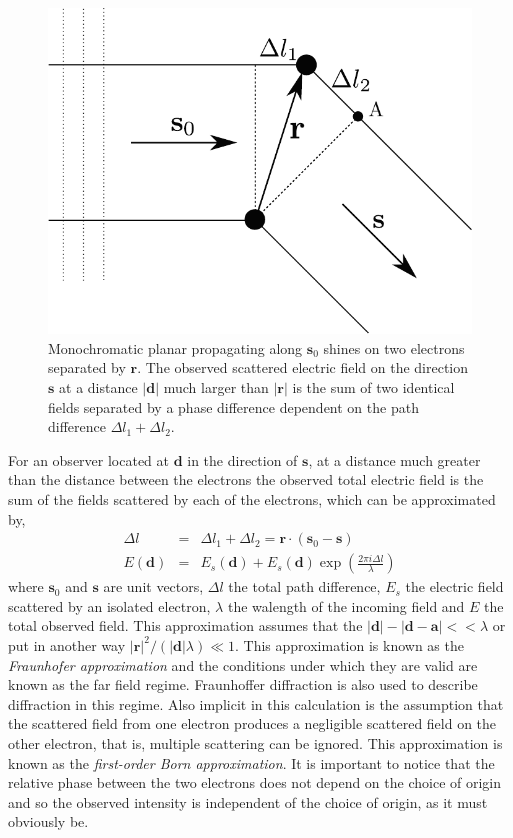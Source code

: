 \begin{figure}[h]
\begin{center}
\includegraphics[width=0.7 \columnwidth]{Diffraction_Theory/two_electrons.pdf}
\end{center}
\caption{Monochromatic planar propagating along $\mathbf s_0$ shines on two
  electrons separated by $\mathbf r$. The observed scattered electric field on the
  direction $\mathbf s$ at a distance $| \mathbf d|$ much larger than $|\mathbf r|$ is the
  sum of two identical fields separated by a phase difference dependent on the path difference $\Delta l_1 + \Delta l_2$.}
\label{Fig:two_electrons}
\end{figure}
For an observer located at $\mathbf d$ in the direction of $\mathbf s$, at a distance
much greater than the distance between the electrons the observed total electric
field is the sum of the fields scattered by each of the electrons, which can be
approximated by,
\begin{eqnarray}
\Delta l & = & \Delta l_1 + \Delta l_2 = \mathbf r \cdot (\mathbf s_0 - \mathbf s)\\
E(\mathbf d) & = & E_s(\mathbf d) + E_s(\mathbf d) \exp(\frac{2 \pi i \Delta l}{\lambda})
\end{eqnarray}
where $\mathbf s_0$ and $\mathbf s$ are unit vectors, $\Delta l$ the total path
difference, $E_s$ the electric field scattered by an isolated electron, $\lambda$
the walength of the incoming field and $E$ the total observed field.
This approximation assumes that the $|\mathbf d| -
|\mathbf d- \mathbf a| << \lambda$ or put in another way $|\mathbf r|^2/(|\mathbf d| \lambda) \ll
1 $. This approximation is known as the {\em Fraunhofer approximation} and the conditions
under which they are valid are known as the far field regime. Fraunhoffer
diffraction is also used to describe diffraction in this regime. Also implicit
in this calculation is the assumption that the scattered field from one electron produces a
negligible scattered field on the other electron, that is, multiple
scattering can be ignored. This approximation is known as the {\em first-order Born
  approximation}.
It is
important to notice that the relative phase between the two electrons does not
depend on the choice of origin and so the observed intensity is independent of
the choice of origin, as it must obviously be. 


